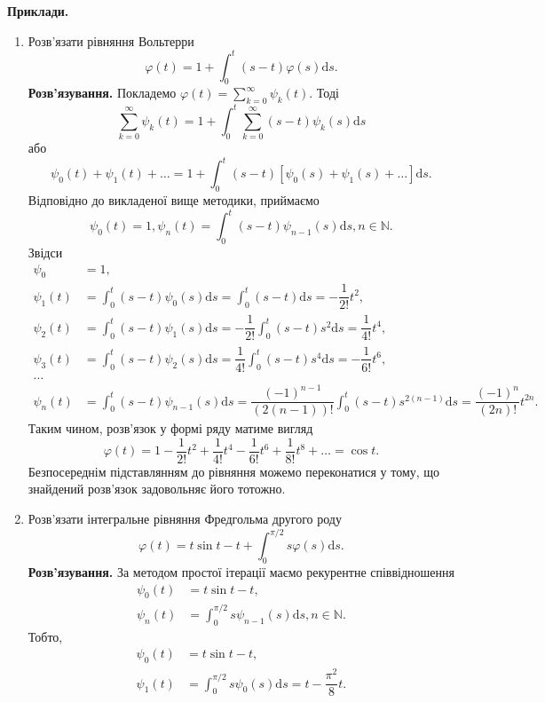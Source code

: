 \documentclass[14pt,twoside]{extreport}
\theoremstyle{mystyle}
\numberwithin{equation}{chapter}
\begin{document}
\begin{small}
 \textbf{Приклади.}
 \begin{enumerate}
  \item Розв'язати рівняння Вольтерри
  \[
   \varphi(t) = 1+ \int_{0}^{t} (s-t) \varphi(s) \mathrm{d} s.
  \]
  \textbf{Розв'язування.}
  Покладемо $\varphi(t)=\displaystyle \sum_{k=0}^{\infty}\psi_{k}(t)$. Тоді
  \[
   \displaystyle \sum_{k=0}^{\infty}\psi_{k}(t) = 1+ \int_{0}^{t} \sum_{k=0}^{\infty}(s-t) \psi_{k}(s) \mathrm{d}s
  \]
  або
  \[
   \psi_0(t) + \psi_1(t) + \ldots = 1 + \int_{0}^{t}(s-t)[\psi_0(s) + \psi_1(s) + \ldots] \mathrm{d}s.
  \]
  Відповідно до викладеної вище методики, приймаємо
  \[
   \psi_0(t) = 1, \psi_{n}(t) = \int_{0}^{t} (s-t) \psi_{n-1}(s) \mathrm{d}s, n\in \mathbb{N}.
  \]
  Звідси
  \begin{align*}
   \psi_0 &=1,\\
   \psi_1(t) &= \int_{0}^{t} (s-t) \psi_0(s) \mathrm{d}s = \int_{0}^{t} (s-t) \mathrm{d}s = -\dfrac{1}{2!}t^2,\\
   \psi_2(t) &= \int_{0}^{t} (s-t) \psi_1(s) \mathrm{d}s = -\dfrac{1}{2!} \int_{0}^{t} (s-t) s^2 \mathrm{d}s = \dfrac{1}{4!}t^4,\\
   \psi_3(t) &= \int_{0}^{t} (s-t) \psi_2(s) \mathrm{d}s = \dfrac{1}{4!} \int_{0}^{t} (s-t) s^4\mathrm{d}s = -\dfrac{1}{6!}t^6,\\
   \ldots\\
   \psi_n(t) &= \int_{0}^{t} (s-t) \psi_{n-1}(s) \mathrm{d}s = \dfrac{(-1)^{n-1}}{(2(n-1))!} \int_{0}^{t} (s-t) s^{2(n-1)}\mathrm{d}s = \dfrac{(-1)^n}{(2n)!}t^{2n}.
  \end{align*}
  Таким чином, розв'язок у формі ряду матиме вигляд
  \[
   \varphi(t) = 1 - \dfrac{1}{2!} t^2 + \dfrac{1}{4!} t^4 - \dfrac{1}{6!} t^6 + \dfrac{1}{8!} t^8 + \ldots = \cos t.
  \]
  Безпосереднім підставлянням до рівняння можемо переконатися у тому, що знайдений розв'язок задовольняє його тотожно.
  \item Розв'язати інтегральне рівняння Фредгольма другого роду
  \[
   \varphi(t) = t\sin t - t + \int_{0}^{\pi/2} s \varphi(s) \mathrm{d}s.
  \]
  \textbf{Розв'язування.}
  За методом простої ітерації маємо рекурентне співвідношення
  \begin{align*}
   \psi_{0}(t) &= t\sin t - t,\\
   \psi_{n}(t) &= \int_{0}^{\pi/2} s \psi_{n-1}(s) \mathrm{d}s, n \in  \mathbb{N}.
  \end{align*}
  Тобто,
  \begin{align*}
   \psi_{0}(t) &= t\sin t - t,\\
   \psi_{1}(t) &= \int_{0}^{\pi/2} s \psi_{0}(s) \mathrm{d}s = t - \dfrac{\pi^2}{8}t.
  \end{align*}


\end{enumerate}
\end{small}
\end{document}
